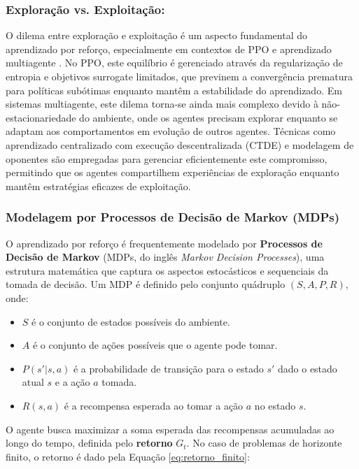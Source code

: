 \subsubsection*{Exploração vs. Exploitação:}
O dilema entre exploração e exploitação é um aspecto fundamental do aprendizado por reforço, especialmente em contextos de PPO e aprendizado multiagente \cite{sutton}. No PPO, este equilíbrio é gerenciado através da regularização de entropia e objetivos surrogate limitados, que previnem a convergência prematura para políticas subótimas enquanto mantêm a estabilidade do aprendizado. Em sistemas multiagente, este dilema torna-se ainda mais complexo devido à não-estacionariedade do ambiente, onde os agentes precisam explorar enquanto se adaptam aos comportamentos em evolução de outros agentes. Técnicas como aprendizado centralizado com execução descentralizada (CTDE) e modelagem de oponentes são empregadas para gerenciar eficientemente este compromisso, permitindo que os agentes compartilhem experiências de exploração enquanto mantêm estratégias eficazes de exploitação.

\subsubsection*{Modelagem por Processos de Decisão de Markov (MDPs)}

O aprendizado por reforço é frequentemente modelado por \textbf{Processos de Decisão de Markov} (MDPs, do inglês \textit{Markov Decision Processes}), uma estrutura matemática que captura os aspectos estocásticos e sequenciais da tomada de decisão. Um MDP é definido pelo conjunto quádruplo \((S, A, P, R)\), onde:

\begin{itemize}
    \item \(S\) é o conjunto de estados possíveis do ambiente.
    \item \(A\) é o conjunto de ações possíveis que o agente pode tomar.
    \item \(P(s'|s, a)\) é a probabilidade de transição para o estado \(s'\) dado o estado atual \(s\) e a ação \(a\) tomada.
    \item \(R(s, a)\) é a recompensa esperada ao tomar a ação \(a\) no estado \(s\).
\end{itemize}

O agente busca maximizar a soma esperada das recompensas acumuladas ao longo do tempo, definida pelo \textbf{retorno} \(G_t\). No caso de problemas de horizonte finito, o retorno é dado pela Equação \ref{eq:retorno_finito}:

